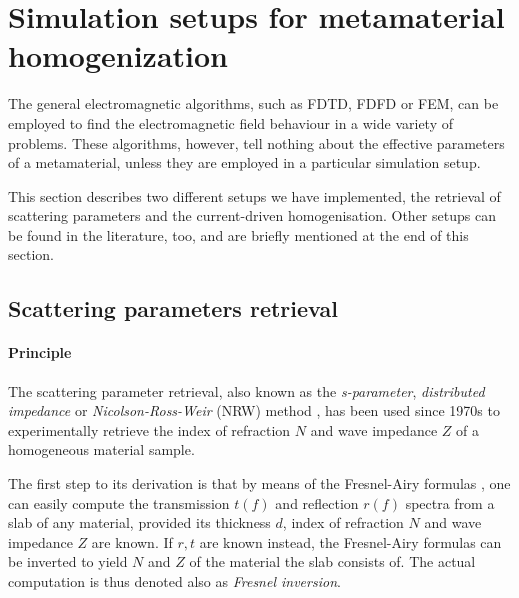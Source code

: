 \section{Simulation setups for metamaterial homogenization} %
The general electromagnetic algorithms,%
such as FDTD, FDFD or FEM, can be employed to find the electromagnetic field behaviour in a wide variety of problems. These algorithms, however, tell nothing about the effective parameters of a metamaterial, unless they are employed in a particular simulation setup. 

This section describes two different setups we have implemented, the retrieval of scattering parameters and the current-driven homogenisation. Other setups can be found in the literature, too, and are briefly mentioned at the end of this section.
\subsection{Scattering parameters retrieval}
\label{chapter_sparam}
\paragraph{Principle} %
The scattering parameter retrieval, also known as the \textit{s-parameter}, \textit{distributed impedance} or \textit{Nicolson-Ross-Weir} (NRW) method \cite{nicolson1970measurement, weir1974automatic}, has been used since 1970s to experimentally retrieve the index of refraction $N$ and wave impedance $Z$ of a homogeneous material sample.

The first step to its derivation is that by means of the Fresnel-Airy formulas \cite[p. 329]{born1999book},
one can easily compute the transmission $t(f)$ and reflection $r(f)$ spectra from a slab of any material, provided its thickness $d$, index of refraction $N$ and wave impedance $Z$ are known.  If $r,t$ are known instead, the Fresnel-Airy formulas can be inverted to yield $N$ and $Z$ of the material the slab consists of. The actual computation is thus denoted also as \textit{Fresnel inversion}.

